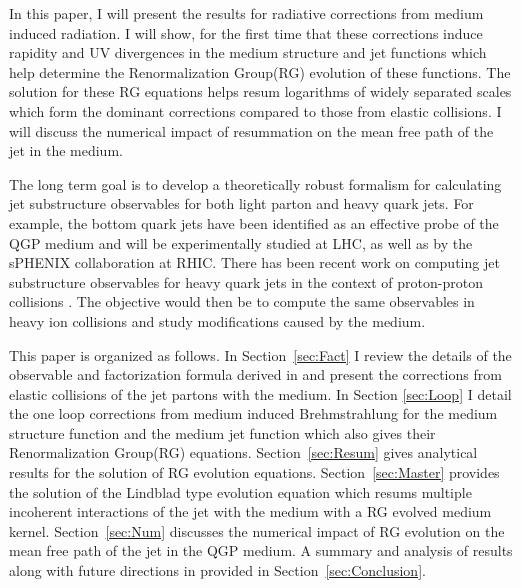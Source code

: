 \documentclass[letter,11pt]{article}
\begin{document}
In this paper, I will present the results for radiative corrections from medium induced radiation. I will show, for the first time that these corrections induce rapidity and UV divergences in the medium structure and jet functions which help determine the Renormalization Group(RG) evolution of these functions. The solution for these RG equations helps resum logarithms of widely separated scales which form the dominant corrections compared to those from elastic collisions. I will discuss the numerical impact of resummation on the mean free path of the jet in the medium.

The long term goal is to develop a theoretically robust formalism for calculating jet substructure observables for both light parton and heavy quark jets. For example, the bottom quark jets have been identified as an effective probe of the QGP medium and will be experimentally studied at LHC, as well as by the sPHENIX collaboration at RHIC. There has been recent work on computing jet substructure observables for heavy quark jets in the context of proton-proton collisions \cite{Lee:2019lge,Makris:2018npl}. The objective would then be to compute the same observables in heavy ion collisions and study modifications caused by the medium.

This paper is organized as follows.
In Section~\ref{sec:Fact} I review the details of the observable and factorization formula derived in \cite{Vaidya:2020lih}  and present the corrections from elastic collisions of the jet partons with the medium. In Section \ref{sec:Loop} I detail the one loop corrections from medium induced Brehmstrahlung for the medium structure function and the medium jet function which also gives their Renormalization Group(RG) equations. Section~\ref{sec:Resum} gives analytical results for the solution of RG evolution equations. Section~\ref{sec:Master} provides the solution of the Lindblad type evolution equation which resums multiple incoherent interactions of the jet with the medium with a RG evolved medium kernel. Section~\ref{sec:Num} discusses the numerical impact of RG evolution on the mean free path of the jet in the QGP medium. A summary and analysis of results along with future directions in provided in Section~\ref{sec:Conclusion}.

\end{document}
